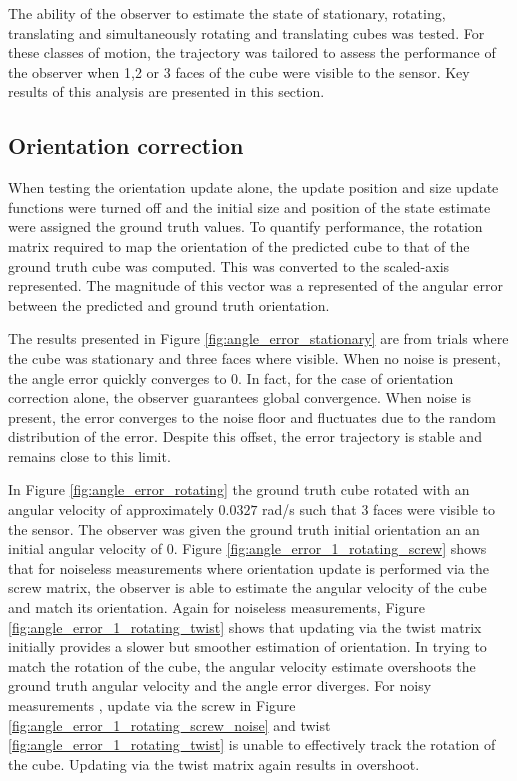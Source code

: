 The ability of the observer to estimate the state of stationary, rotating, translating and simultaneously rotating and translating cubes was tested. For these classes of motion, the trajectory was tailored to assess the performance of the observer when 1,2 or 3 faces of the cube were visible to the sensor. Key results of this analysis are presented in this section.

\subsection{Orientation correction}
When testing the orientation update alone, the update position and size update functions were turned off and the initial size and position of the state estimate were assigned the ground truth values. To quantify performance, the rotation matrix required to map the orientation of the predicted cube to that of the ground truth cube was computed. This was converted to the scaled-axis represented. The magnitude of this vector was a represented of the angular error between the predicted and ground truth orientation.

The results presented in Figure \ref{fig:angle_error_stationary} are from trials where the cube was stationary and three faces where visible. When no noise is present, the angle error quickly converges to 0. In fact, for the case of orientation correction alone, the observer guarantees global convergence. When noise is present, the error converges to the noise floor and fluctuates due to the random distribution of the error. Despite this offset, the error trajectory is stable and remains close to this limit. 

In Figure \ref{fig:angle_error_rotating} the ground truth cube rotated with an angular velocity of approximately $0.0327$ rad/s such that 3 faces were visible to the sensor. The observer was given the ground truth initial orientation an an initial angular velocity of 0.
Figure \ref{fig:angle_error_1_rotating_screw} shows that for noiseless measurements where orientation update is performed via the screw matrix, the observer is able to estimate the angular velocity of the cube and match its orientation. Again for noiseless measurements, Figure \ref{fig:angle_error_1_rotating_twist} shows that updating via the twist matrix initially provides a slower but smoother estimation of orientation. In trying to match the rotation of the cube, the angular velocity estimate overshoots the ground truth angular velocity and the angle error diverges. 
For noisy measurements , update via the screw in Figure \ref{fig:angle_error_1_rotating_screw_noise} and twist \ref{fig:angle_error_1_rotating_twist} is unable to effectively track the rotation of the cube. Updating via the twist matrix again results in overshoot. 

